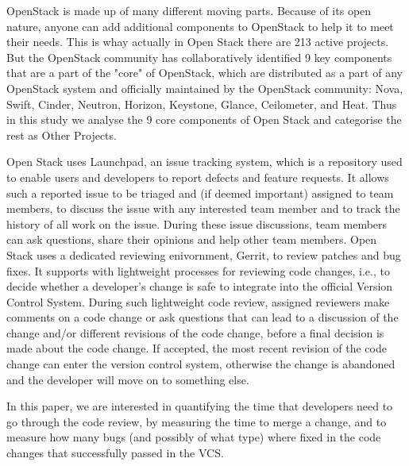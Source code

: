 \documentclass[ifip]{svmult}
\begin{document}
OpenStack is made up of many different moving parts. Because of its open nature, anyone can add additional components to OpenStack 
to help it to meet their needs. This is whay actually in Open Stack there are 213 active projects. 
But the OpenStack community has collaboratively identified 9 key components that are a part of 
the "core" of OpenStack, which are distributed as a part of any OpenStack system and officially maintained by the OpenStack community: 
Nova, Swift, Cinder, Neutron, Horizon, Keystone, Glance, Ceilometer, and Heat.
Thus in this study we analyse the 9 core components of Open Stack and categorise the rest as Other Projects.

Open Stack uses Launchpad, an issue tracking system, which is a repository used to enable
users and developers to report defects and feature requests. It allows such a reported issue to be triaged and (if  deemed
important) assigned to team members, to discuss the issue
with any interested team member and to track the history of
all work on the issue. During these issue discussions, team
members can ask questions, share their opinions and help
other team members. Open Stack uses a dedicated reviewing enivornment, 
Gerrit, to  review  patches  and  bug  fixes. It supports with 
lightweight processes for reviewing code changes, i.e., 
to decide whether a developer’s change is safe to
integrate into the official Version Control System. During such
lightweight  code  review,  assigned  reviewers  make  comments
on a code change or ask questions that can lead to a discussion
of  the  change  and/or  different  revisions  of  the  code  change,
before  a  final  decision  is  made  about  the  code  change.  If
accepted, the most recent revision of the code change can enter
the version control system, otherwise the change is abandoned
and the developer will move on to something else.  

In this paper, we are interested in quantifying the time that developers need 
to go through the code review, by measuring the time to merge a change,
and to measure how many bugs (and possibly of what type) where fixed in the
code changes that successfully  passed in the VCS.

\end{document}
